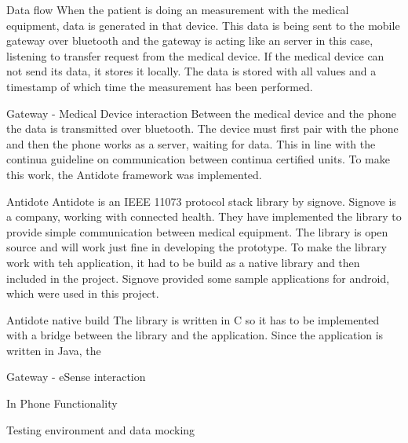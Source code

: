 Data flow
When the patient is doing an measurement with the medical equipment, data is generated in that device. This data is being sent to the mobile gateway over bluetooth and the gateway is acting like an server in this case, listening to transfer request from the medical device. If the medical device can not send its data, it stores it locally. The data is stored with all values and a timestamp of which time the measurement has been performed. 



Gateway - Medical Device interaction
Between the medical device and the phone the data is transmitted over bluetooth. The device must first pair with the phone and then the phone works as a server, waiting for data. This in line with the continua guideline on communication between continua certified units. To make this work, the Antidote framework was implemented.

Antidote
Antidote is an IEEE 11073 protocol stack library by signove. Signove is a company, working with connected health. They have implemented the library to provide simple communication between medical equipment. The library is open source and will work just fine in developing the prototype. To make the library work with teh application, it had to be build as a native library and then included in the project. Signove provided some sample applications for android, which were used in this project.

Antidote native build
The library is written in C so it has to be implemented with a bridge between the library and the application. Since the application is written in Java, the 

Gateway - eSense interaction

In Phone Functionality

Testing environment and data mocking